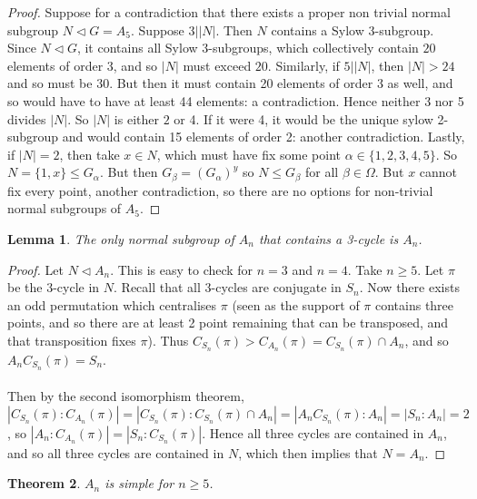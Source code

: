 \documentclass[a4paper,10pt]{article}
\newtheorem{thm}{Theorem}
\newtheorem{Lem}[thm]{Lemma}
\begin{document}
\begin{proof}
Suppose for a contradiction that there exists a proper non trivial normal subgroup $N \triangleleft G = A_5$. Suppose $3\big| |N|$. Then $N$ contains a Sylow $3$-subgroup. Since $N \triangleleft G$, it contains all Sylow $3$-subgroups, which collectively contain $20$ elements of order 3, and so $|N|$ must exceed $20$. Similarly, if $5 \big| |N|$, then $|N| > 24$ and so must be $30$. But then it must contain 20 elements of order 3 as well, and so would have to have at least 44 elements: a contradiction. Hence neither 3 nor 5 divides $|N|$. So $|N|$ is either $2$ or 4. If it were 4, it would be the unique sylow 2-subgroup and would contain 15 elements of order 2: another contradiction. Lastly, if $|N| = 2$, then take $x \in N$, which must have fix some point $\alpha \in \{ 1,2,3,4,5 \}$. So $N = \{ 1 , x\} \leq G_\alpha$. But then $G_\beta = (G_\alpha)^y$ so $N \leq G_\beta$ for all $\beta \in \Omega$. But $x$ cannot fix every point, another contradiction, so there are no options for non-trivial normal subgroups of $A_5$.
\end{proof}


\begin{Lem}
The only normal subgroup of $A_n$ that contains a 3-cycle is $A_n$.
\end{Lem}


\begin{proof}
Let $N \triangleleft A_n$. This is easy to check for $n =3$ and $n=4$. Take $n \geq 5$. Let $\pi$ be the $3$-cycle in $N$. Recall that all $3$-cycles are conjugate in $S_n$. Now there exists an odd permutation which centralises $\pi$ (seen as the support of $\pi$ contains three points, and so there are at least 2 point remaining that can be transposed, and that transposition fixes $\pi$). Thus $C_{S_n}(\pi)  > C_{A_n}(\pi) = C_{S_n}(\pi) \cap A_n$, and so $A_n C_{S_n}(\pi) = S_n$. \\
\\
Then by the second isomorphism theorem, $| C_{S_n}(\pi) : C_{A_n}(\pi) | = |C_{S_n}(\pi) : C_{S_n}(\pi) \cap A_n | = | A_n C_{S_n}(\pi) : A_n | = |S_n : A_n| = 2$, so $|A_n : C_{A_n}(\pi)| = |S_n : C_{S_n}(\pi)|$. Hence all three cycles are contained in $A_n$, and so all three cycles are contained in $N$, which then implies that $N = A_n$. 
\end{proof}


\begin{thm}
$A_n$ is simple for $n \geq 5$. 
\end{thm}
\end{document}
